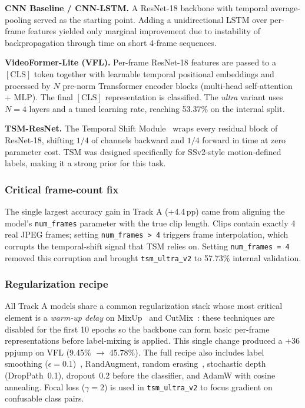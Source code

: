 \documentclass[10pt,twocolumn,letterpaper]{article}
\newcommand{\pp}{\,pp}
\begin{document}
\textbf{CNN Baseline / CNN-LSTM.}  A ResNet-18 backbone with temporal
average-pooling served as the starting point.  Adding a unidirectional
LSTM over per-frame features yielded only marginal improvement due to
instability of backpropagation through time on short 4-frame sequences.

\textbf{VideoFormer-Lite (VFL).}  Per-frame ResNet-18 features are passed
to a $[\text{CLS}]$ token together with learnable temporal positional
embeddings and processed by $N$ pre-norm Transformer encoder blocks
(multi-head self-attention + MLP).  The final $[\text{CLS}]$
representation is classified.  The \emph{ultra} variant uses $N{=}4$
layers and a tuned learning rate, reaching 53.37\% on the internal
split.

\textbf{TSM-ResNet.}  The Temporal Shift Module~\cite{lin2019tsm} wraps
every residual block of ResNet-18, shifting $1/4$ of channels backward
and $1/4$ forward in time at zero parameter cost.  TSM was designed
specifically for SSv2-style motion-defined labels, making it a strong
prior for this task.

\subsubsection{Critical frame-count fix}

The single largest accuracy gain in Track A (+4.4\pp) came from aligning
the model's \texttt{num\_frames} parameter with the true clip length.
Clips contain exactly 4 real JPEG frames; setting \texttt{num\_frames\,>\,4}
triggers frame interpolation, which corrupts the temporal-shift signal
that TSM relies on.  Setting \texttt{num\_frames\,=\,4} removed this
corruption and brought \texttt{tsm\_ultra\_v2} to 57.73\% internal validation.

\subsubsection{Regularization recipe}

All Track A models share a common regularization stack whose most critical
element is a \emph{warm-up delay} on MixUp~\cite{zhang2018mixup} and
CutMix~\cite{yun2019cutmix}: these techniques are disabled for the first
10 epochs so the backbone can form basic per-frame representations before
label-mixing is applied.  This single change produced a +36\pp jump on
VFL (9.45\% $\to$ 45.78\%).  The full recipe also includes label
smoothing ($\epsilon{=}0.1$)~\cite{szegedy2016inception}, RandAugment,
random erasing~\cite{zhong2020erasing}, stochastic depth
(DropPath~0.1), dropout~0.2 before the classifier, and AdamW with cosine
annealing.  Focal loss ($\gamma{=}2$) is used in \texttt{tsm\_ultra\_v2}
to focus gradient on confusable class pairs.
\end{document}
